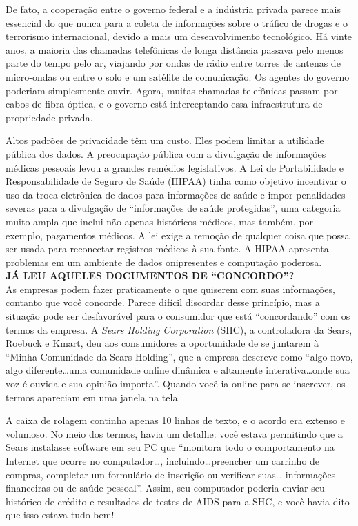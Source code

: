 \documentclass{book}
\newcommand{\ingles}[1]{\textit{#1}}
\begin{document}
De fato, a cooperação entre o governo federal e a indústria privada parece mais
essencial do que nunca para a coleta de informações sobre o tráfico de drogas e
o terrorismo internacional, devido a mais um desenvolvimento tecnológico. Há
vinte anos, a maioria das chamadas telefônicas de longa distância passava pelo
menos parte do tempo pelo ar, viajando por ondas de rádio entre torres de antenas
de micro-ondas ou entre o solo e um satélite de comunicação. Os agentes do governo
poderiam simplesmente ouvir. Agora, muitas chamadas telefônicas passam por cabos
de fibra óptica, e o governo está interceptando essa infraestrutura de propriedade
privada.

Altos padrões de privacidade têm um custo. Eles podem limitar a utilidade pública
dos dados. A preocupação pública com a divulgação de informações médicas pessoais
levou a grandes remédios legislativos. A Lei de Portabilidade e Responsabilidade
de Seguro de Saúde (HIPAA) tinha como objetivo incentivar o uso da troca
eletrônica de dados para informações de saúde e impor penalidades severas para
a divulgação de ``informações de saúde protegidas'', uma categoria muito ampla
que inclui não apenas históricos médicos, mas também, por exemplo, pagamentos
médicos. A lei exige a remoção de qualquer coisa que possa ser usada para
reconectar registros médicos à sua fonte. A HIPAA apresenta problemas em um
ambiente de dados onipresentes e computação poderosa.\\

\textbf{JÁ LEU AQUELES DOCUMENTOS DE ``CONCORDO''?}\\
As empresas podem fazer praticamente o que quiserem com suas informações,
contanto que você concorde. Parece difícil discordar desse princípio, mas
a situação pode ser desfavorável para o consumidor que está ``concordando''
com os termos da empresa. A \ingles{Sears Holding Corporation} (SHC), a
controladora da Sears, Roebuck e Kmart, deu aos consumidores a oportunidade
de se juntarem à ``Minha Comunidade da Sears Holding'', que a empresa
descreve como ``algo novo, algo diferente\ldots uma comunidade online
dinâmica e altamente interativa\ldots onde sua voz é ouvida e sua opinião
importa''. Quando você ia online para se inscrever, os termos apareciam em
uma janela na tela.

A caixa de rolagem continha apenas 10 linhas de texto, e o acordo era extenso
e volumoso. No meio dos termos, havia um detalhe: você estava permitindo que
a Sears instalasse software em seu PC que ``monitora todo o comportamento na
Internet que ocorre no computador\ldots, incluindo\ldots preencher um carrinho
de compras, completar um formulário de inscrição ou verificar suas\ldots
informações financeiras ou de saúde pessoal''. Assim, seu computador poderia
enviar seu histórico de crédito e resultados de testes de AIDS para a SHC, e
você havia dito que isso estava tudo bem!\\
\end{document}

